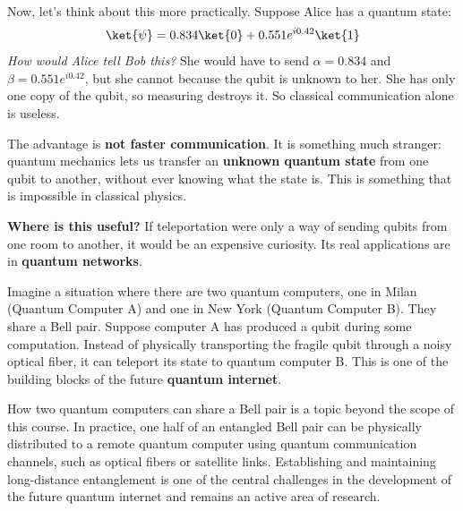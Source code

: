 \highspace
Now, let's think about this more practically. Suppose Alice has a quantum state:
\begin{equation*}
    \ket{\psi} = 0.834\ket{0} + 0.551e^{i 0.42}\ket{1}
\end{equation*}
\emph{How would Alice tell Bob this?} She would have to send $\alpha = 0.834$ and $\beta = 0.551e^{i 0.42}$, but she cannot because the qubit is unknown to her. She has only one copy of the qubit, so measuring destroys it. So classical communication alone is useless.

\highspace
The advantage is \textbf{not faster communication}. It is something much stranger: quantum mechanics lets us transfer an \textbf{unknown quantum state} from one qubit to another, without ever knowing what the state is. This is something that is impossible in classical physics.

\highspace
\textcolor{Green3}{ \textbf{Where is this useful?}} If teleportation were only a way of sending qubits from one room to another, it would be an expensive curiosity. Its real applications are in \textbf{quantum networks}.

\highspace
Imagine a situation where there are two quantum computers, one in Milan (Quantum Computer A) and one in New York (Quantum Computer B). They share a Bell pair. Suppose computer A has produced a qubit during some computation. Instead of physically transporting the fragile qubit through a noisy optical fiber, it can teleport its state to quantum computer B. This is one of the building blocks of the future \textbf{quantum internet}.

\highspace
How two quantum computers can share a Bell pair is a topic beyond the scope of this course. In practice, one half of an entangled Bell pair can be physically distributed to a remote quantum computer using quantum communication channels, such as optical fibers or satellite links. Establishing and maintaining long-distance entanglement is one of the central challenges in the development of the future quantum internet and remains an active area of research.